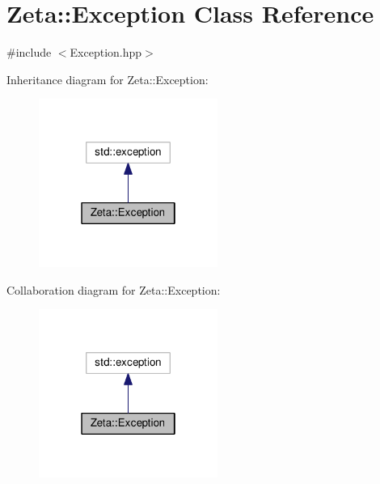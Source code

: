 \hypertarget{classZeta_1_1Exception}{\section{Zeta\+:\+:Exception Class Reference}
\label{classZeta_1_1Exception}
}


{\ttfamily \#include $<$Exception.\+hpp$>$}



Inheritance diagram for Zeta\+:\+:Exception\+:\nopagebreak
\begin{figure}[H]
\begin{center}
\leavevmode
\includegraphics[width=166pt]{classZeta_1_1Exception__inherit__graph}
\end{center}
\end{figure}


Collaboration diagram for Zeta\+:\+:Exception\+:\nopagebreak
\begin{figure}[H]
\begin{center}
\leavevmode
\includegraphics[width=166pt]{classZeta_1_1Exception__coll__graph}
\end{center}
\end{figure}
